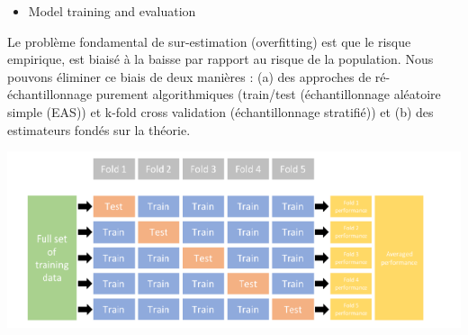 \documentclass[
  8pt,
  ignorenonframetext,
]{beamer}
\providecommand{\tightlist}{%
  \setlength{\itemsep}{0pt}\setlength{\parskip}{0pt}}
\begin{document}
\begin{frame}
\begin{itemize}
\tightlist
\item
  Model training and evaluation
\end{itemize}

Le problème fondamental de sur-estimation (overfitting) est que le
risque empirique, est biaisé à la baisse par rapport au risque de la
population. Nous pouvons éliminer ce biais de deux manières : (a) des
approches de ré-échantillonnage purement algorithmiques (train/test
(échantillonnage aléatoire simple (EAS)) et k-fold cross validation
(échantillonnage stratifié)) et (b) des estimateurs fondés sur la
théorie.\pause

\begin{center}\includegraphics[width=0.7\linewidth,height=0.5\textheight]{fig/kcv} \end{center}
\end{frame}
\end{document}
